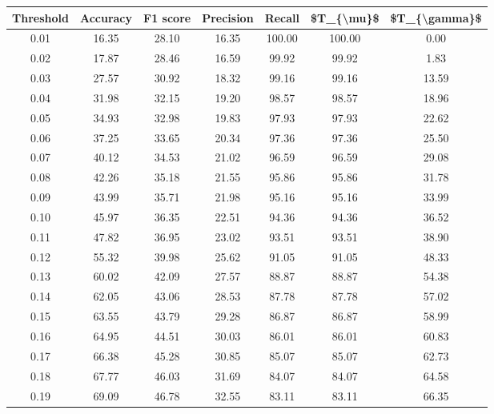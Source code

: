 \begin{tabular}{|c|c|c|c|c|c|c|}
\toprule
 Threshold &  Accuracy &  F1 score &  Precision &  Recall &  \$T\_\{\textbackslash mu\}\$ &  \$T\_\{\textbackslash gamma\}\$ \\
\hline
      0.01 &     16.35 &     28.10 &      16.35 &  100.00 &     100.00 &          0.00 \\
      0.02 &     17.87 &     28.46 &      16.59 &   99.92 &      99.92 &          1.83 \\
      0.03 &     27.57 &     30.92 &      18.32 &   99.16 &      99.16 &         13.59 \\
      0.04 &     31.98 &     32.15 &      19.20 &   98.57 &      98.57 &         18.96 \\
      0.05 &     34.93 &     32.98 &      19.83 &   97.93 &      97.93 &         22.62 \\
      0.06 &     37.25 &     33.65 &      20.34 &   97.36 &      97.36 &         25.50 \\
      0.07 &     40.12 &     34.53 &      21.02 &   96.59 &      96.59 &         29.08 \\
      0.08 &     42.26 &     35.18 &      21.55 &   95.86 &      95.86 &         31.78 \\
      0.09 &     43.99 &     35.71 &      21.98 &   95.16 &      95.16 &         33.99 \\
      0.10 &     45.97 &     36.35 &      22.51 &   94.36 &      94.36 &         36.52 \\
      0.11 &     47.82 &     36.95 &      23.02 &   93.51 &      93.51 &         38.90 \\
      0.12 &     55.32 &     39.98 &      25.62 &   91.05 &      91.05 &         48.33 \\
      0.13 &     60.02 &     42.09 &      27.57 &   88.87 &      88.87 &         54.38 \\
      0.14 &     62.05 &     43.06 &      28.53 &   87.78 &      87.78 &         57.02 \\
      0.15 &     63.55 &     43.79 &      29.28 &   86.87 &      86.87 &         58.99 \\
      0.16 &     64.95 &     44.51 &      30.03 &   86.01 &      86.01 &         60.83 \\
      0.17 &     66.38 &     45.28 &      30.85 &   85.07 &      85.07 &         62.73 \\
      0.18 &     67.77 &     46.03 &      31.69 &   84.07 &      84.07 &         64.58 \\
      0.19 &     69.09 &     46.78 &      32.55 &   83.11 &      83.11 &         66.35 \\

\end{tabular}
